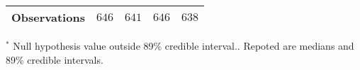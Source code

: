 \begin{table}[h]
\begin{center}
\begin{threeparttable}
\begin{tabular}{l c c c c}
\hline
Observations                                           & $646$             & $641$            & $646$             & $638$            \\
\hline
\end{tabular}
\begin{tablenotes}[flushleft]
\scriptsize{$^*$ Null hypothesis value outside 89\% credible interval.. Repoted are medians and 89\% credible intervals.}
\end{tablenotes}
\end{threeparttable}
\label{table:ol-polint-ru-pol-667}
\end{center}
\end{table}
